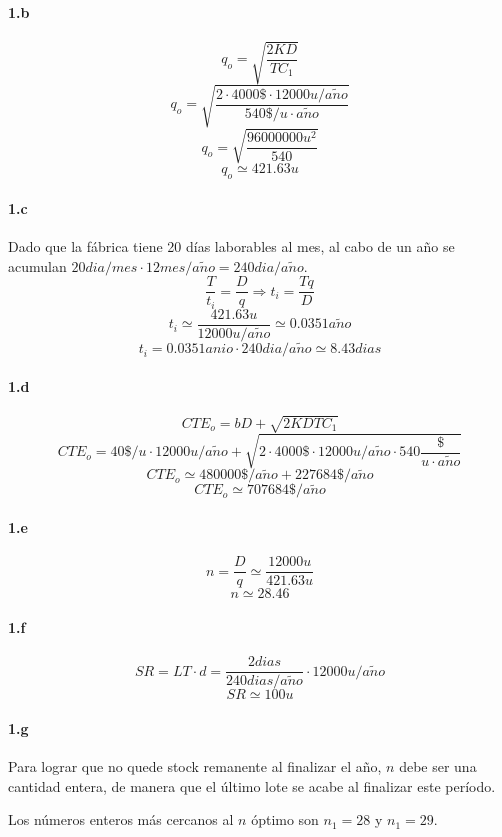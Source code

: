 \documentclass[a4paper,10pt]{article}
\def \anio {a\tilde{n}o}
\begin{document}
  \paragraph{1.b}
        $$ q_o = \sqrt{ \frac{2KD}{TC_1}} $$
        $$ q_o = \sqrt{ \frac{2 \cdot 4000\$ \cdot 12000u/\anio}{540\$/u\cdot\anio}} $$
        $$ q_o = \sqrt{ \frac{96000000u^2}{540}} $$
        $$ \boxed{ q_o \simeq 421.63u} $$

  \paragraph{1.c}
	Dado que la fábrica tiene 20 días laborables al mes, al cabo de un año se acumulan $20 dia/mes \cdot 12 mes/\anio = 240 dia/\anio$.
        $$ \frac{T}{t_i} = \frac{D}{q} \Rightarrow t_i = \frac{Tq}{D} $$
        $$ t_i \simeq \frac{421.63u}{12000u/\anio} \simeq 0.0351\anio $$
        $$ \boxed{ t_i = 0.0351anio \cdot 240dia/\anio \simeq 8.43dias } $$

  \paragraph{1.d}
        $$ CTE_o = bD + \sqrt{ 2KDTC_1 } $$
        $$ CTE_o = 40\$/u \cdot 12000u/\anio + \sqrt{ 2 \cdot 4000\$ \cdot 12000u/\anio \cdot 540\frac{\$}{u\cdot\anio} } $$
        $$ CTE_o \simeq 480000\$/\anio + 227684\$/\anio $$
        $$ \boxed{ CTE_o \simeq 707684\$/\anio } $$

  \paragraph{1.e}
        $$ n = \frac{D}{q} \simeq \frac{12000u}{421.63u} $$
        $$ \boxed{ n \simeq 28.46 } $$

  \paragraph{1.f}
        $$ SR = LT \cdot d = \frac{2 dias}{240dias/\anio} \cdot  12000u/\anio $$
        $$ \boxed{ SR \simeq 100u } $$

  \paragraph{1.g}
	Para lograr que no quede stock remanente al finalizar el año, $n$ debe ser una cantidad entera, de manera que el último lote se acabe al finalizar este período.

	Los números enteros más cercanos al $n$ óptimo son $n_1 = 28$ y $n_1 = 29$.
\end{document}
